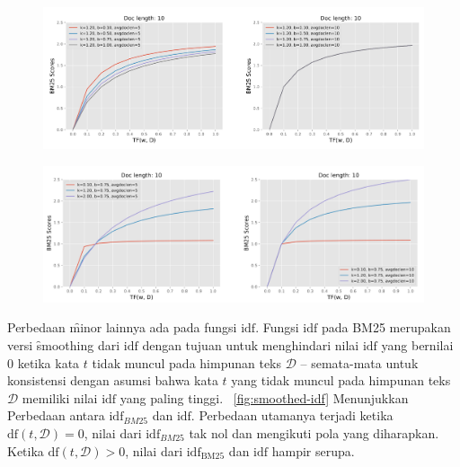     \begin{figure}
        \centering
        \includegraphics[width=1\textwidth]{assets/pics/effect-bm25-param-b.png}
        \label{fig:effect-bm25-param-b}
    \end{figure}
    \begin{figure}
        \centering
        \includegraphics[width=1\textwidth]{assets/pics/effect-bm25-param-k.png}
        \label{fig:effect-bm25-param-k}
    \end{figure}
    
    Perbedaan \f{minor} lainnya ada pada fungsi $\text{idf}$. Fungsi $\text{idf}$ pada BM25 merupakan versi \f{smoothing} dari $\text{idf}$ dengan tujuan untuk menghindari nilai $\text{idf}$ yang bernilai 0 ketika kata $t$ tidak muncul pada himpunan teks $\mathcal{D}$ -- semata-mata untuk konsistensi dengan asumsi bahwa kata $t$ yang tidak muncul pada himpunan teks $\mathcal{D}$ memiliki nilai $\text{idf}$ yang paling tinggi. \pic~\ref{fig:smoothed-idf} Menunjukkan Perbedaan antara $\text{idf}_{BM25}$ dan $\text{idf}$. Perbedaan utamanya terjadi ketika $\text{df}(t,\mathcal{D}) = 0$, nilai dari  $\text{idf}_{BM25}$ tak nol dan mengikuti pola yang diharapkan. Ketika $\text{df}(t,\mathcal{D})>0$, nilai dari $\text{idf}_{\text{BM25}}$ dan $\text{idf}$ hampir serupa.

